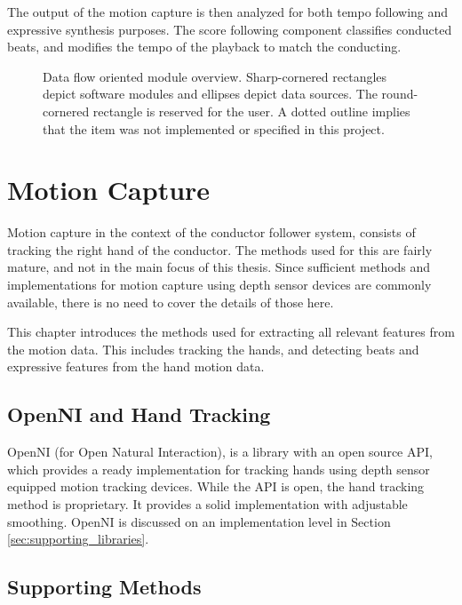 The output of the motion capture is then analyzed
for both tempo following and expressive synthesis purposes.
The score following component classifies conducted beats,
and modifies the tempo of the playback to match the conducting.

\begin{figure}
\begin{center}

\caption{
Data flow oriented module overview.
Sharp-cornered rectangles depict software modules and
ellipses depict data sources.
The round-cornered rectangle is reserved for the user.
A dotted outline implies that the item was not
implemented or specified in this project.
}
\label{fig:architecture}
\end{center}
\end{figure}

\chapter{Motion Capture}
\label{chapter:motion_capture}

Motion capture in the context of the conductor follower system,
consists of tracking the right hand of the conductor.
The methods used for this are fairly mature,
and not in the main focus of this thesis.
Since sufficient methods and implementations for
motion capture using depth sensor devices
are commonly available,
there is no need to cover the details of those here.

This chapter introduces the methods used for
extracting all relevant features from the motion data.
This includes tracking the hands,
and detecting beats and expressive features
from the hand motion data.

\section{OpenNI and Hand Tracking}

OpenNI (for Open Natural Interaction),
is a library with an open source API,
which provides
a ready implementation for tracking hands
using depth sensor equipped motion tracking devices.
While the API is open, 
the hand tracking method is proprietary.
It provides a solid implementation
with adjustable smoothing.
OpenNI is discussed on an implementation level in Section
\ref{sec:supporting_libraries}.

\section{Supporting Methods}

